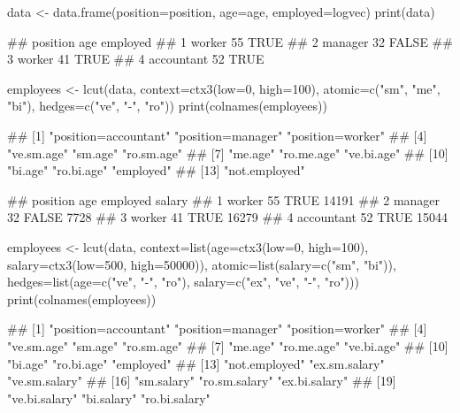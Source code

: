 \documentclass{article}\usepackage[]{graphicx}\usepackage[]{color}
\begin{document}
\begin{Schunk}
% --begin: "lcut.data.frame"
\begin{Sinput}
data <- data.frame(position=position,
                   age=age,
                   employed=logvec)
print(data)
\end{Sinput}
\begin{Soutput}
##     position age employed
## 1     worker  55     TRUE
## 2    manager  32    FALSE
## 3     worker  41     TRUE
## 4 accountant  52     TRUE
\end{Soutput}
\begin{Sinput}
employees <- lcut(data,
     context=ctx3(low=0, high=100),
     atomic=c("sm", "me", "bi"),
     hedges=c("ve", "-", "ro"))
print(colnames(employees))
\end{Sinput}
\begin{Soutput}
##  [1] "position=accountant" "position=manager"    "position=worker"    
##  [4] "ve.sm.age"           "sm.age"              "ro.sm.age"          
##  [7] "me.age"              "ro.me.age"           "ve.bi.age"          
## [10] "bi.age"              "ro.bi.age"           "employed"           
## [13] "not.employed"
\end{Soutput}
%
% --end: "lcut.data.frame"
\end{Schunk}

\begin{Schunk}
% --begin: "lcut.data.frame2"
\begin{Soutput}
##     position age employed salary
## 1     worker  55     TRUE  14191
## 2    manager  32    FALSE   7728
## 3     worker  41     TRUE  16279
## 4 accountant  52     TRUE  15044
\end{Soutput}
\begin{Sinput}
employees <- lcut(data,
                  context=list(age=ctx3(low=0, high=100),
                               salary=ctx3(low=500, high=50000)),
                  atomic=list(salary=c("sm", "bi")),
                  hedges=list(age=c("ve", "-", "ro"),
                              salary=c("ex", "ve", "-", "ro")))
print(colnames(employees))
\end{Sinput}
\begin{Soutput}
##  [1] "position=accountant" "position=manager"    "position=worker"    
##  [4] "ve.sm.age"           "sm.age"              "ro.sm.age"          
##  [7] "me.age"              "ro.me.age"           "ve.bi.age"          
## [10] "bi.age"              "ro.bi.age"           "employed"           
## [13] "not.employed"        "ex.sm.salary"        "ve.sm.salary"       
## [16] "sm.salary"           "ro.sm.salary"        "ex.bi.salary"       
## [19] "ve.bi.salary"        "bi.salary"           "ro.bi.salary"
\end{Soutput}
%
% --end: "lcut.data.frame2"
\end{Schunk}
\end{document}
